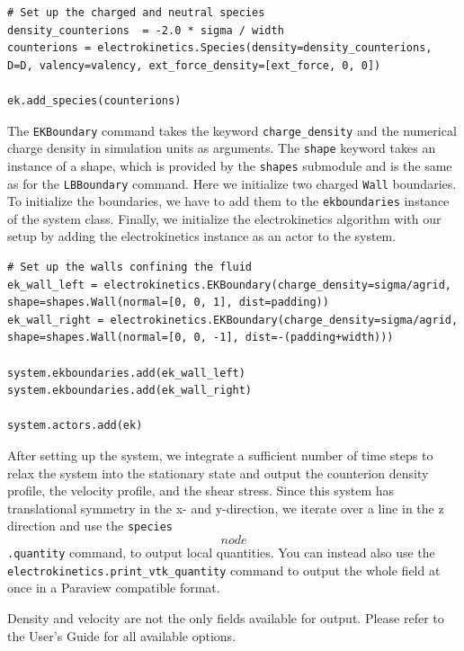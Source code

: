 \begin{lstlisting}[firstnumber=45]
# Set up the charged and neutral species
density_counterions  = -2.0 * sigma / width
counterions = electrokinetics.Species(density=density_counterions, D=D, valency=valency, ext_force_density=[ext_force, 0, 0])

ek.add_species(counterions)
\end{lstlisting}

The \texttt{EKBoundary} command takes the keyword \texttt{charge\_density} and the numerical charge density in simulation units as arguments. The \texttt{shape} keyword takes an instance of a shape, which is provided by the \texttt{shapes} submodule and is the same as for the \texttt{LBBoundary} command. Here we initialize two charged \texttt{Wall} boundaries. To initialize the boundaries, we have to add them to the \texttt{ekboundaries} instance of the system class. Finally, we initialize the electrokinetics algorithm with our setup by adding the electrokinetics instance as an actor to the system.

\begin{lstlisting}[firstnumber=53]
# Set up the walls confining the fluid
ek_wall_left = electrokinetics.EKBoundary(charge_density=sigma/agrid, shape=shapes.Wall(normal=[0, 0, 1], dist=padding)) 
ek_wall_right = electrokinetics.EKBoundary(charge_density=sigma/agrid, shape=shapes.Wall(normal=[0, 0, -1], dist=-(padding+width)))

system.ekboundaries.add(ek_wall_left)
system.ekboundaries.add(ek_wall_right)

system.actors.add(ek)
\end{lstlisting}

After setting up the system, we integrate a sufficient number of time steps to relax the system into the stationary state and output the counterion density profile, the velocity profile, and the shear stress. Since this system has translational symmetry in the x- and y-direction, we iterate over a line in the z direction and use the \texttt{species\[node\].quantity} command, to output local quantities. You can instead also use the \texttt{electrokinetics.print\_vtk\_quantity} command to output the whole field at once in a Paraview compatible format.

Density and velocity are not the only fields available for output. Please refer to the User's Guide for all available options.

